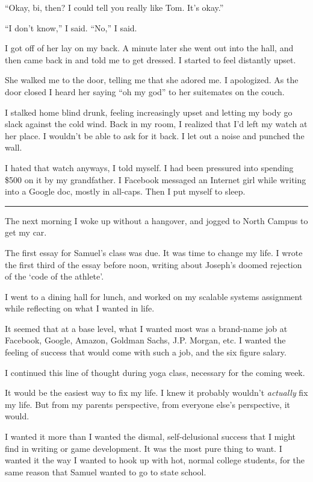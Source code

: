``Okay, bi, then?  I could tell you really like Tom.  It's okay.''

``I don't know,'' I said.  ``No,'' I said.

I got off of her lay on my back.  A minute later she went out into the hall, and
then came back in and told me to get dressed.  I started to feel distantly
upset.

She walked me to the door, telling me that she adored me.  I apologized.  As the
door closed I heard her saying ``oh my god'' to her suitemates on the couch.

I stalked home blind drunk, feeling increasingly upset and letting my body go
slack against the cold wind.  Back in my room, I realized that I'd left my watch
at her place.  I wouldn't be able to ask for it back.  I let out a noise and
punched the wall. 

I hated that watch anyways, I told myself. I had been pressured into spending
\$500 on it by my grandfather.  I Facebook messaged an Internet girl while
writing into a Google doc, mostly in all-caps.  Then I put myself to sleep.

\plainfancybreak{12pt}{2}{* * *}

The next morning I woke up without a hangover, and jogged to North Campus to get
my car.  

The first essay for Samuel's class was due.  It was time to change my life.  I
wrote the first third of the essay before noon, writing about Joseph's doomed
rejection of the `code of the athlete'.

I went to a dining hall for lunch, and worked on my scalable systems assignment
while reflecting on what I wanted in life.

It seemed that at a base level, what I wanted most was a brand-name job at
Facebook, Google, Amazon, Goldman Sachs, J.P.  Morgan, etc.  I wanted the
feeling of success that would come with such a job, and the six figure salary.

I continued this line of thought during yoga class, necessary for the coming
week.

It would be the easiest way to fix my life.  I knew it probably wouldn't
\textit{actually} fix my life.  But from my parents perspective, from everyone
else's perspective, it would.  

I wanted it more than I wanted the dismal, self-delusional success that I might
find in writing or game development.  It was the most pure thing to want. I
wanted it the way I wanted to hook up with hot, normal college students, for the
same reason that Samuel wanted to go to state school. 

